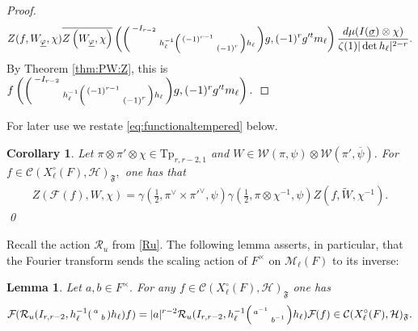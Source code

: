 \documentclass[12pt]{amsart}
\newtheorem{cor}[thm]{Corollary}
\newtheorem{lem}[thm]{Lemma}
\theoremstyle{remark}
\numberwithin{equation}{section}
\theoremstyle{definition}
\newenvironment{psmatrix}
  {\left(\begin{smallmatrix}}
  {\end{smallmatrix}\right)}
\numberwithin{equation}{subsection}
\begin{document}
\begin{proof}
\begin{align*}
    Z(f,W_{\underline{\varphi}},\chi)\overline{Z\left(W_{\underline{\varphi}},\chi\right)}\left(\begin{psmatrix} -I_{r-2}& \\ & h_\ell^{-1} \begin{psmatrix} (-1)^{r-1} &\\ & (-1)^{r}\end{psmatrix} h_\ell  \end{psmatrix}g,(-1)^{r}g'^tm_{\ell}\right)
\frac{d\mu(I(\underline{\sigma}) \otimes \chi)}{\zeta(1)|\det h_\ell|^{2-r}}.
\end{align*}
  By Theorem \ref{thm:PW:Z}, this is $
f\left(\begin{psmatrix} -I_{r-2}& \\ & h_\ell^{-1} \begin{psmatrix} (-1)^{r-1} &\\ & (-1)^{r}\end{psmatrix} h_\ell  \end{psmatrix}g,(-1)^{r}g'^tm_{\ell}\right).$
\end{proof}


For later use we restate \eqref{eq:functionaltempered} below.

\begin{cor} \label{cor:temp:func:eqn}
Let $\pi \otimes \pi'\otimes \chi\in \mathrm{Tp}_{r,r-2,1}$ and $W\in \mathcal{W}(\pi,\psi) \otimes \mathcal{W}(\pi',\overline{\psi}).$ For $f \in \mathcal{C}(X_\ell^\circ(F),\mathcal{H})_{\mathfrak{F}},$ one has that
\begin{align*}
    Z(\mathcal{F}(f),W,\chi)=\gamma(\tfrac{1}{2},\pi^\vee \times \pi'^\vee,\psi)\gamma(\tfrac{1}{2},\pi \otimes \chi^{-1},\psi)Z(f,\widetilde{W},\chi^{-1}).
\end{align*}
\qed
\end{cor}


 Recall the action $\mathcal{R}_u$ from \eqref{Ru}. The following lemma asserts, in particular, that the Fourier transform sends the scaling action of $F^\times$ on $\mathcal{M}_{\ell}(F)$ to its inverse:

\begin{lem} \label{lem:FT:scalar}
Let $a,b \in F^\times.$
For any $f \in \mathcal{C}(X^{\circ}_{\ell}(F),\mathcal{H})_{\mathfrak{F}}$ one has  
$$
\mathcal{F}_{}(\mathcal{R}_u(I_{r,r-2},h_\ell^{-1} \begin{psmatrix} a & \\ & b \end{psmatrix} h_\ell)f)=
|a|^{r-2}\mathcal{R}_u(I_{r,r-2},h_\ell^{-1} \begin{psmatrix} a^{-1} & \\ & b^{-1} \end{psmatrix} h_\ell )  \mathcal{F}_{}(f) \in \mathcal{C}(X^{\circ}_{\ell}(F),\mathcal{H})_{\mathfrak{F}}.
$$
\end{lem}
\end{document}
